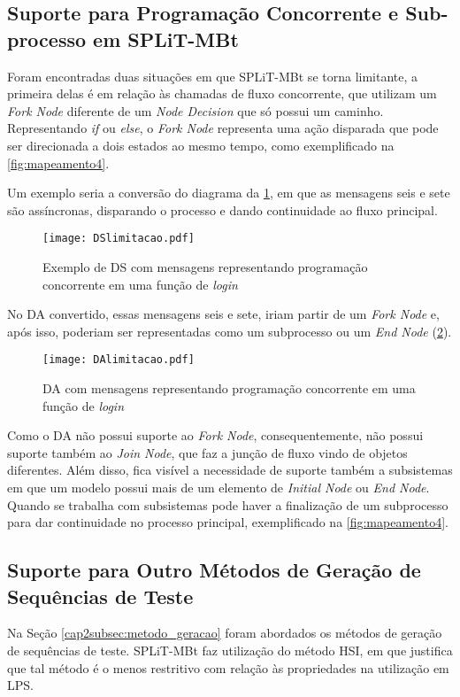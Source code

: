 \subsection{Suporte para Programação Concorrente e Sub-processo em SPLiT-MBt}
\label{cap5sec:limitacaoconcorrencia}
Foram encontradas duas situações em que SPLiT-MBt se torna limitante, a primeira delas é em relação às chamadas de fluxo concorrente, que utilizam um \textit{Fork Node} diferente de um \textit{Node Decision} que só possui um caminho. Representando \textit{if} ou \textit{else}, o \textit{Fork Node} representa uma ação disparada que pode ser direcionada a dois estados ao mesmo tempo, como exemplificado na \ref{fig:mapeamento4}.

Um exemplo seria a conversão do diagrama da \ref{fig:dslimitacao}, em que as mensagens seis e sete são assíncronas, disparando o processo e dando continuidade ao fluxo principal.

\begin{figure}[H]
	\centering
	\texttt{[image: DSlimitacao.pdf]}
	\caption{Exemplo de DS com mensagens representando  programação concorrente em uma função de \textit{login}}
	\label{fig:dslimitacao}
\end{figure}

No DA convertido, essas mensagens seis e sete, iriam partir de um \textit{Fork Node} e, após isso, poderiam ser representadas como um subprocesso ou um \textit{End Node} (\ref{fig:dalimitacao}).

\begin{figure}[H]
	\centering
	\texttt{[image: DAlimitacao.pdf]}
	\caption{DA com mensagens representando programação concorrente em uma função de \textit{login}}
	\label{fig:dalimitacao}
\end{figure}

Como o DA não possui suporte ao \textit{Fork Node}, consequentemente, não possui suporte também ao \textit{Join Node}, que faz a junção de fluxo vindo de objetos diferentes. Além disso, fica visível a necessidade de suporte também a subsistemas em que um modelo possui mais de um elemento de \textit{Initial Node} ou \textit{End Node}. Quando se trabalha com subsistemas pode haver a finalização de um subprocesso para dar continuidade no processo principal, exemplificado na \ref{fig:mapeamento4}.

\subsection{Suporte para Outro Métodos de Geração de Sequências de Teste}
Na Seção \ref{cap2subsec:metodo_geracao} foram abordados os métodos de geração de sequências de teste. SPLiT-MBt faz utilização do método HSI, em que \citet{costa2016split} justifica que tal método é o menos restritivo com relação às propriedades na utilização em LPS.

